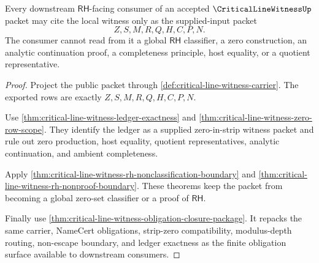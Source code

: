\begin{theorem}
\label{thm:critical-line-witness-downstream-refusal-package}
Every downstream $\mathsf{RH}$-facing consumer of an accepted $\CriticalLineWitnessUp$ packet may cite the local witness only as the supplied-input packet
$$
Z,S,M,R,Q,H,C,P,N.
$$
The consumer cannot read from it a global $\mathsf{RH}$ classifier, a zero construction, an analytic continuation proof, a completeness principle, host equality, or a quotient representative.
\end{theorem}
\begin{proof}
Project the public packet through \autoref{def:critical-line-witness-carrier}. The exported rows are exactly $Z,S,M,R,Q,H,C,P,N$.

Use \autoref{thm:critical-line-witness-ledger-exactness} and \autoref{thm:critical-line-witness-zero-row-scope}. They identify the ledger as a supplied zero-in-strip witness packet and rule out zero production, host equality, quotient representatives, analytic continuation, and ambient completeness.

Apply \autoref{thm:critical-line-witness-rh-nonclassification-boundary} and \autoref{thm:critical-line-witness-rh-nonproof-boundary}. These theorems keep the packet from becoming a global zero-set classifier or a proof of $\mathsf{RH}$.

Finally use \autoref{thm:critical-line-witness-obligation-closure-package}. It repacks the same carrier, NameCert obligations, strip-zero compatibility, modulus-depth routing, non-escape boundary, and ledger exactness as the finite obligation surface available to downstream consumers.
\end{proof}

